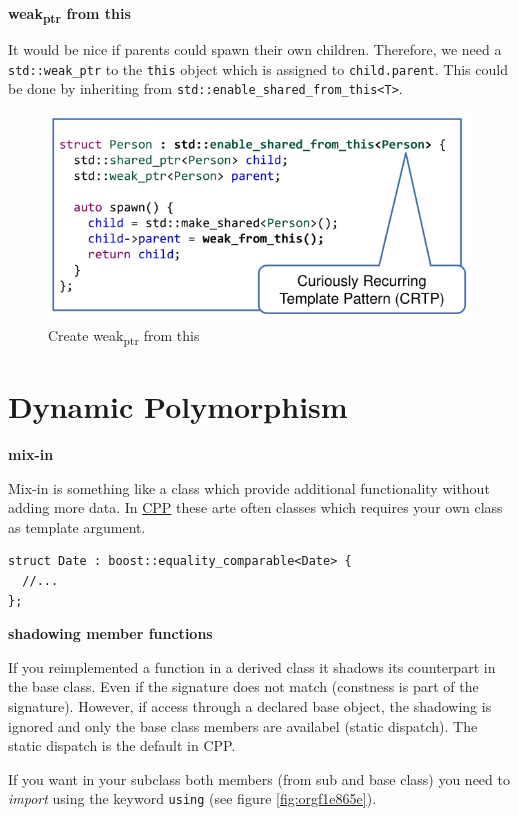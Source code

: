 \documentclass[11pt,twoside,landscape]{article}
\begin{document}
\begin{multicols}{3}
\textbf{weak\textsubscript{ptr} from this}

It would be nice if parents could spawn their own children.
Therefore, we need a \texttt{std::weak\_ptr} to the \texttt{this} object which is assigned to \texttt{child.parent}.
This could be done by inheriting from \texttt{std::enable\_shared\_from\_this<T>}.

\begin{figure}[htbp]
\centering
\includegraphics[width=.9\linewidth]{img/enable_shared_from_this.png}
\caption{Create weak\textsubscript{ptr} from this}
\end{figure}

\section{Dynamic Polymorphism}
\label{sec:org106ff97}
\textbf{mix-in}

Mix-in is something like a class which provide additional functionality without adding more data.
In \href{../../../roam/20210920103243-c.org}{CPP} these arte often classes which requires your own class as template argument.

\lstset{language=c++,label= ,caption= ,captionpos=b,numbers=none}
\begin{lstlisting}
struct Date : boost::equality_comparable<Date> {
  //...
};
\end{lstlisting}

\textbf{shadowing member functions}

If you reimplemented a function in a derived class it shadows its counterpart in the base class.
Even if the signature does not match (constness is part of the signature).
However, if access through a declared base object, the shadowing is ignored and only the base class members are availabel (static dispatch).
The static dispatch is the default in CPP.

If you want in your subclass both members (from sub and base class) you need to \emph{import} using the keyword \texttt{using} (see figure \ref{fig:orgf1e865e}).


\end{multicols}
\end{document}
